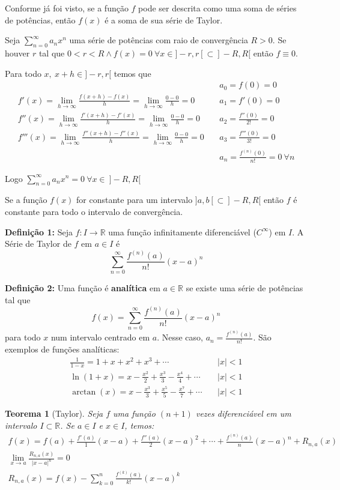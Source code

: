 \documentclass[12pt,openany, letterpaper]{book}
\newtheorem{theorem}{Teorema}[section]
\newcommand{\LI}[1][n]{\lim_{{#1} \rightarrow \infty}}
\newcommand{\soma}[2][n]{\sum_{{#1} = #2}^\infty}
\begin{document}
{{Conforme já foi visto, se a função $f$ pode ser descrita como uma soma de séries de potências, então $f(x)$ é a soma de sua série de Taylor.

Seja $\displaystyle{\soma{0} a_n x^n}$ uma série de potências com raio de convergência $R > 0$. Se houver $r$ tal que $0 < r < R \land f(x) = 0 \ \forall x \in ]-r,r[ \subset ]-R,R[$ então $f \equiv 0$.

Para todo $x, \ x+h \in ]-r,r[$ temos que \begin{align}
        & \ & a_0 = f(0) = 0 \\
        f'(x) = \LI[h] \frac{f(x+h)-f(x)}{h} = \LI[h] \frac{0-0}{h} = 0 & \ & a_1 = f'(0) = 0 \\
        f''(x) = \LI[h] \frac{f'(x+h)-f'(x)}{h} = \LI[h] \frac{0-0}{h} = 0 & \ & a_2 = \frac{f''(0)}{2!} = 0 \\
        f'''(x) = \LI[h] \frac{f''(x+h)-f''(x)}{h} = \LI[h] \frac{0-0}{h} = 0 & \ & a_3 = \frac{f'''(0)}{3!} = 0\\
        & \ & a_n = \frac{f^{(n)}(0)}{n!} = 0 \ \forall n
    \end{align}

Logo $\displaystyle{\soma{0} a_n x^n = 0 \ \forall x \in \ ]-R,R[}$

Se a função $f(x)$ for constante para um intervalo $]a,b[ \subset ]-R,R[$ então $f$ é constante para todo o intervalo de convergência.
\vspace{5mm}

\textbf{Definição 1:} Seja $f: I \rightarrow \mathds{R}$ uma função infinitamente diferenciável ($C^\infty$) em $I$. A Série de Taylor de $f$ em $a \in I$ é $$\soma{0} \frac{f^{(n)}(a)}{n!} (x-a)^n$$ 

\textbf{Definição 2:} Uma função é \textbf{analítica} em $a \in \mathds{R}$ se existe uma série de potências tal que $$f(x) = \soma{0} \frac{f^{(n)}(a)}{n!} (x-a)^n$$ para todo $x$ num intervalo centrado em $a$. Nesse caso, $a_n = \frac{f^{(n)}(a)}{n!}$. São exemplos de funções analíticas: \begin{align*}
\frac{1}{1-x} = 1 + x + x^2 + x^3 + \cdots & \ & |x| < 1 \\
\ln (1+x) = x - \frac{x^2}{2} + \frac{x^3}{3} - \frac{x^4}{4} + \cdots & \ & |x| < 1 \\
\arctan (x) = x - \frac{x^3}{3} + \frac{x^5}{5} - \frac{x^7}{7} + \cdots & \ & |x| < 1
\end{align*}

\begin{theorem}[Taylor]
Seja $f$ uma função $(n+1)$ vezes diferenciável em um intervalo $I \subset \mathds{R}$. Se $a \in I$ e $x \in I$, temos: \begin{align*}
    f(x) = f(a) + \frac{f'(a)}{1}(x-a) + \frac{f''(a)}{2}(x-a)^2 + \cdots + \frac{f^{(n)}(a)}{n}(x-a)^n + R_{n,a}(x) \\
    \lim_{x \rightarrow a} \frac{R_{n,a}(x)}{|x-a|^n}=0 \\
    R_{n,a}(x) = f(x) - \sum_{k=0}^n \frac{f^{(k)}(a)}{k!}(x-a)^k
    \end{align*}
\end{theorem}

}}
\end{document}

